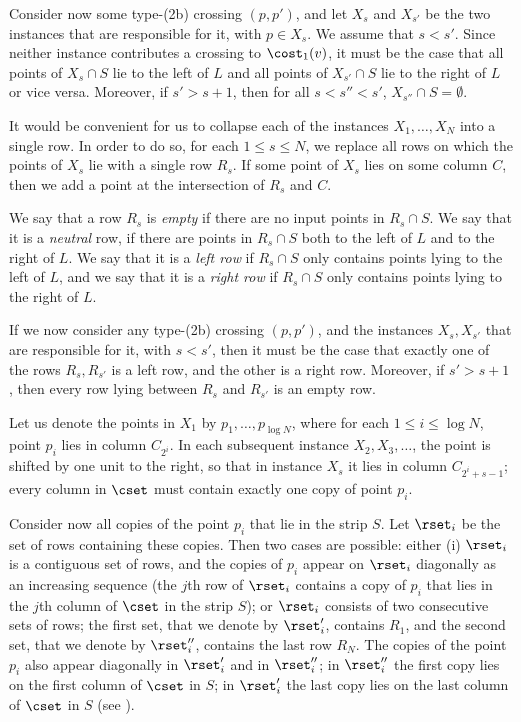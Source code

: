\documentclass{toc}
\begin{document}
Consider now some type-(2b) crossing $(p,p')$, and let $X_s$ and $X_{s'}$ be the two instances that are responsible for it, with $p\in X_s$. We assume that $s<s'$. Since neither instance contributes a crossing to $\cost_1(v)$, it must be the case that all points of $X_s\cap S$ lie to the left of $L$ and all points of $X_{s'}\cap S$ lie to the right of $L$ or vice versa.
Moreover, if $s'>s+1$, then for all $s<s''<s'$, $X_{s''}\cap S=\emptyset$.

It would be convenient for us to collapse each of the instances $X_1,\ldots,X_{N}$ into a single row. In order to do so, for each $1\leq s\leq N$, we replace all rows on which the points of $X_s$ lie with a single row $R_s$. If some point of $X_s$ lies on some column $C$, then we add a point at the intersection of $R_s$ and $C$.

We say that a row $R_s$ is \emph{empty} if there are no input points in $R_s\cap S$. We say that it is a \emph{neutral} row, if there are points in $R_s\cap S$ both to the left of $L$ and to the right of $L$. We say that it is a \emph{left row} if $R_s\cap S$ only contains points lying to the left of $L$, and we say that it is a \emph{right row} if $R_s\cap S$ only contains points lying to the right of $L$.

If we now consider any type-(2b) crossing $(p,p')$, and the instances $X_s,X_{s'}$ that are responsible for it, with $s<s'$, then it must be the case that exactly one of the rows $R_s,R_{s'}$ is a left row, and the other is a right row. Moreover, if $s'>s+1$, then every row lying between $R_s$ and $R_{s'}$ is an empty row.

Let us denote the points in $X_1$ by $p_1,\ldots,p_{\log N}$, where for each $1\leq i\leq \log N$, point $p_i$ lies in column $C_{2^i}$. 
In each subsequent instance $X_2,X_3,\ldots$, the point is shifted by one unit to the right, so that in instance $X_s$ it lies in column $C_{2^i+s-1}$; every column in $\cset$ must contain exactly one copy of point $p_i$.

Consider now all copies of the point $p_i$ that lie in the strip $S$. Let $\rset_i$ be the set of rows containing these copies. Then two cases are possible: either (i) $\rset_i$ is a contiguous set of rows, and the copies of $p_i$ appear on $\rset_i$ diagonally as an increasing sequence (the $j$th row of $\rset_i$ contains a copy of $p_i$ that lies in the $j$th column of $\cset$ in the strip $S$); or $\rset_i$ consists of two consecutive sets of rows; the first set, that we denote by $\rset'_i$, contains $R_1$, and the second set, that we denote by $\rset''_i$, contains the last row $R_{N}$. The copies of the point $p_i$ also appear diagonally in $\rset'_i$ and in $\rset''_i$; in $\rset''_i$ the first copy lies on the first column of $\cset$ in $S$; in $\rset'_i$ the last copy lies on the last column of $\cset$ in $S$ (see ).
\end{document}
